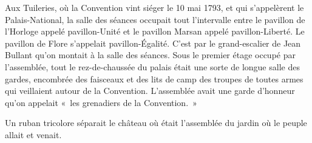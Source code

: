 \documentclass[french,twoside]{book} %
\def\mednobreak{\ifdim\lastskip<\medskipamount
  \removelastskip\nopagebreak\medskip\fi}
\newcommand{\labelblock}[1]{\medbreak{\noindent\color{rubric}\bfseries #1}\par\mednobreak}
\begin{document}
Aux Tuileries, où la Convention vint siéger le 10 mai 1793, et qui s’appelèrent le Palais-National, la salle des séances occupait tout l’intervalle entre le pavillon de l’Horloge appelé pavillon-Unité et le pavillon Marsan appelé pavillon-Liberté. Le pavillon de Flore s’appelait pavillon-Égalité. C’est par le grand-escalier de Jean Bullant qu’on montait à la salle des séances. Sous le premier étage occupé par l’assemblée, tout le rez-de-chaussée du palais était une sorte de longue salle des gardes, encombrée des faisceaux et des lits de camp des troupes de toutes armes qui veillaient autour de la Convention. L’assemblée avait une garde d’honneur qu’on appelait « les grenadiers de la Convention. »\par
Un ruban tricolore séparait le château où était l’assemblée du jardin où le peuple allait et venait.\par

\labelblock{iii}
\end{document}
